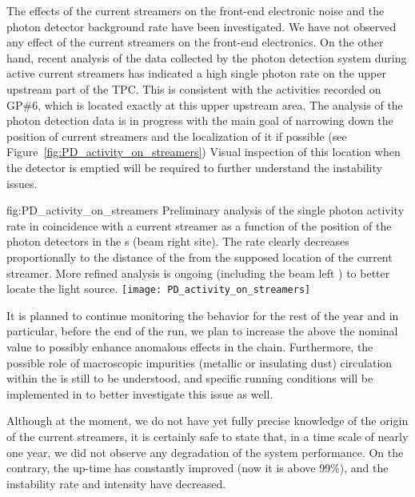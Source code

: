 The effects of the current streamers on the front-end electronic noise and the photon detector background rate have been investigated. We have not observed any effect of the current streamers on the front-end electronics. On the other hand, recent analysis of the data collected by the photon detection system during active current streamers has indicated a high single photon rate on the upper upstream part of the TPC. This is consistent with the activities recorded on GP\#6, which is located exactly at this upper upstream area. The analysis of the photon detection data is in progress with the main goal of narrowing down the position of current streamers and the localization of it if possible (see Figure~\ref{fig:PD_activity_on_streamers})
Visual inspection of this location when the detector is emptied will be required to further understand the  instability issues.

\begin{dunefigure}
{fig:PD_activity_on_streamers}
{Preliminary analysis of the single photon activity rate in coincidence with a current streamer as a function of the position of the photon detectors in the s (beam right site). The rate clearly decreases proportionally to the distance of the  from the supposed location of the current streamer. More refined analysis is ongoing (including the beam left ) to better locate the light source.}
\texttt{[image: PD\_activity\_on\_streamers]}
\end{dunefigure}



It is planned to continue monitoring the  behavior for the rest of the year and in particular, before the end of the run, we plan to increase the  above the nominal value to possibly enhance anomalous effects in the  chain. Furthermore, the possible role of macroscopic impurities (metallic or insulating dust) circulation within the  is still to be understood, and specific running conditions will be implemented in  to better investigate this issue as well. 

Although at the moment, we do not have yet fully precise knowledge of the origin of the current streamers, it is certainly safe to state that, in a time scale of nearly one year, we did not observe any degradation of the  system performance. On the contrary, the up-time has constantly improved (now it is above 99\%), and the instability rate and intensity have decreased. 





